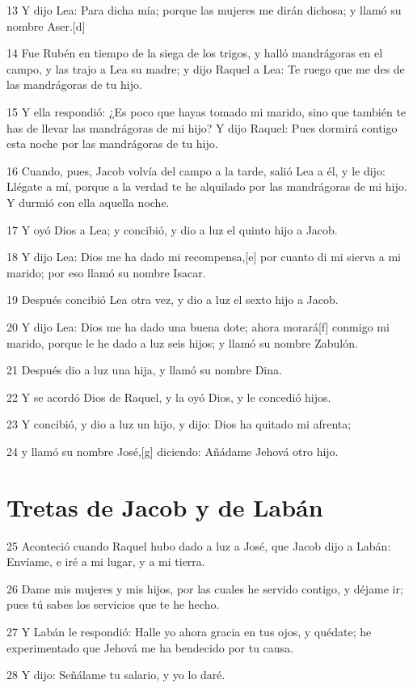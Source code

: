 13 Y dijo Lea: Para dicha mía; porque las mujeres me dirán dichosa; y llamó su nombre Aser.[d]

14 Fue Rubén en tiempo de la siega de los trigos, y halló mandrágoras en el campo, y las trajo a Lea su madre; y dijo Raquel a Lea: Te ruego que me des de las mandrágoras de tu hijo.

15 Y ella respondió: ¿Es poco que hayas tomado mi marido, sino que también te has de llevar las mandrágoras de mi hijo? Y dijo Raquel: Pues dormirá contigo esta noche por las mandrágoras de tu hijo.

16 Cuando, pues, Jacob volvía del campo a la tarde, salió Lea a él, y le dijo: Llégate a mí, porque a la verdad te he alquilado por las mandrágoras de mi hijo. Y durmió con ella aquella noche.

17 Y oyó Dios a Lea; y concibió, y dio a luz el quinto hijo a Jacob.

18 Y dijo Lea: Dios me ha dado mi recompensa,[e] por cuanto di mi sierva a mi marido; por eso llamó su nombre Isacar.

19 Después concibió Lea otra vez, y dio a luz el sexto hijo a Jacob.

20 Y dijo Lea: Dios me ha dado una buena dote; ahora morará[f] conmigo mi marido, porque le he dado a luz seis hijos; y llamó su nombre Zabulón.

21 Después dio a luz una hija, y llamó su nombre Dina.

22 Y se acordó Dios de Raquel, y la oyó Dios, y le concedió hijos.

23 Y concibió, y dio a luz un hijo, y dijo: Dios ha quitado mi afrenta;

24 y llamó su nombre José,[g] diciendo: Añádame Jehová otro hijo.

\section{Tretas de Jacob y de Labán}

25 Aconteció cuando Raquel hubo dado a luz a José, que Jacob dijo a Labán: Envíame, e iré a mi lugar, y a mi tierra.

26 Dame mis mujeres y mis hijos, por las cuales he servido contigo, y déjame ir; pues tú sabes los servicios que te he hecho.

27 Y Labán le respondió: Halle yo ahora gracia en tus ojos, y quédate; he experimentado que Jehová me ha bendecido por tu causa.

28 Y dijo: Señálame tu salario, y yo lo daré.


